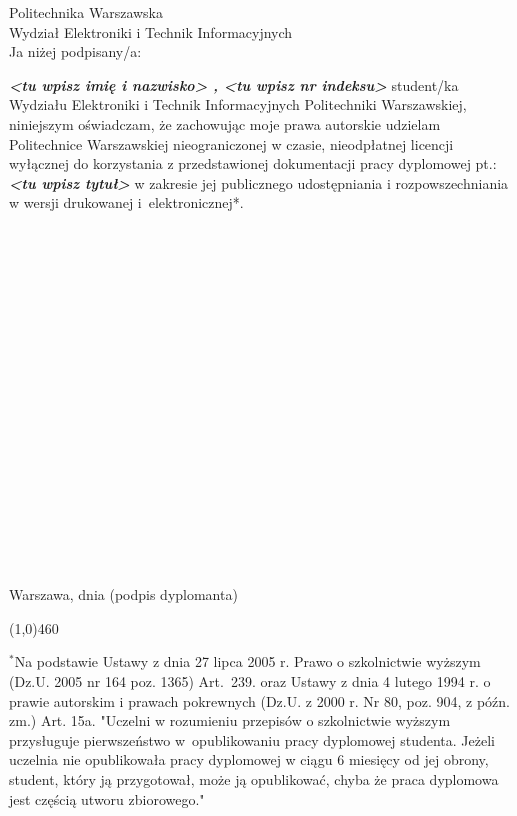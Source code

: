 \setcounter{page}{9}
\vspace{-1.5cm}
\begin{flushleft}
	Politechnika Warszawska \\ 
	Wydział Elektroniki i Technik Informacyjnych  \\
	\vspace{0.5cm}
	Ja niżej podpisany/a: 
\end{flushleft}
\center \textit{\textbf{<tu wpisz imię i nazwisko> , <tu wpisz nr indeksu> }} %
\justify student/ka Wydziału Elektroniki i Technik Informacyjnych Politechniki Warszawskiej, niniejszym oświadczam, że zachowując moje prawa autorskie udzielam Politechnice Warszawskiej nieograniczonej w czasie, nieodpłatnej licencji wyłącznej do korzystania z przedstawionej dokumentacji pracy dyplomowej pt.:
\center \textit{\textbf{ <tu wpisz tytuł> }} 
\justify w zakresie jej publicznego udostępniania i rozpowszechniania w wersji drukowanej i~elektronicznej*.
\\~\\~\\~\\~\\~\\~\\~\\~\\~\\~\\~\\~\\~\\~\\~\\~\\~\\~\\~\\
Warszawa, dnia  \hfill (podpis dyplomanta) 

\begin{center}
	\color{sapphire}
	\line(1,0){460}
\end{center}
\footnotesize \noindent $^{*}$Na podstawie Ustawy z dnia 27 lipca 2005 r. Prawo o szkolnictwie wyższym (Dz.U. 2005 nr 164 poz. 1365) Art.~239. oraz Ustawy z dnia 4 lutego 1994 r. o prawie autorskim i prawach pokrewnych (Dz.U. z 2000 r. Nr 80, poz. 904, z późn. zm.) Art. 15a. "Uczelni w rozumieniu przepisów o szkolnictwie wyższym przysługuje pierwszeństwo w~opublikowaniu pracy dyplomowej studenta. Jeżeli uczelnia nie opublikowała pracy dyplomowej w ciągu 6 miesięcy od jej obrony, student, który ją przygotował, może ją opublikować, chyba że praca dyplomowa jest częścią utworu zbiorowego."

\newpage
\thispagestyle{empty}
\phantom{Nothing here}

